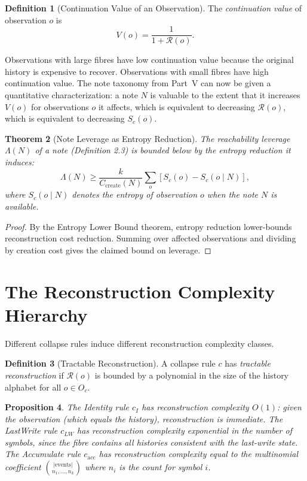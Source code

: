 \documentclass[12pt, a4paper, openany]{book}
\theoremstyle{plain}
\newtheorem{theorem}{Theorem}[chapter]
\newtheorem{proposition}[theorem]{Proposition}
\theoremstyle{definition}
\newtheorem{definition}[theorem]{Definition}
\theoremstyle{remark}
\newcommand{\calR}{\mathcal{R}}
\begin{document}
\begin{definition}[Continuation Value of an Observation]
The \emph{continuation value} of observation $o$ is
\[
V(o) = \frac{1}{1 + \calR(o)}.
\]
\end{definition}

Observations with large fibres have low continuation value because the
original history is expensive to recover. Observations with small fibres have
high continuation value. The note taxonomy from Part~V can now be given a
quantitative characterization: a note $N$ is valuable to the extent that it
increases $V(o)$ for observations $o$ it affects, which is equivalent to
decreasing $\calR(o)$, which is equivalent to decreasing $S_c(o)$.

\begin{theorem}[Note Leverage as Entropy Reduction]
The reachability leverage $\Lambda(N)$ of a note (Definition 2.3) is bounded
below by the entropy reduction it induces:
\[
\Lambda(N) \geq \frac{k}{C_{\mathrm{create}}(N)} \sum_{o} [S_c(o) - S_c(o \mid N)],
\]
where $S_c(o \mid N)$ denotes the entropy of observation $o$ when the note $N$
is available.
\end{theorem}

\begin{proof}
By the Entropy Lower Bound theorem, entropy reduction lower-bounds reconstruction
cost reduction. Summing over affected observations and dividing by creation cost
gives the claimed bound on leverage.
\end{proof}

\section{The Reconstruction Complexity Hierarchy}

Different collapse rules induce different reconstruction complexity classes.

\begin{definition}[Tractable Reconstruction]
A collapse rule $c$ has \emph{tractable reconstruction} if $\calR(o)$ is bounded
by a polynomial in the size of the history alphabet for all $o \in O_c$.
\end{definition}

\begin{proposition}
The Identity rule $c_I$ has reconstruction complexity $O(1)$: given the
observation (which equals the history), reconstruction is immediate. The
LastWrite rule $c_{LW}$ has reconstruction complexity exponential in the
number of symbols, since the fibre contains all histories consistent with the
last-write state. The Accumulate rule $c_{\mathrm{acc}}$ has reconstruction
complexity equal to the multinomial coefficient $\binom{|\text{events}|}{n_1, \ldots, n_k}$
where $n_i$ is the count for symbol $i$.
\end{proposition}
\end{document}
